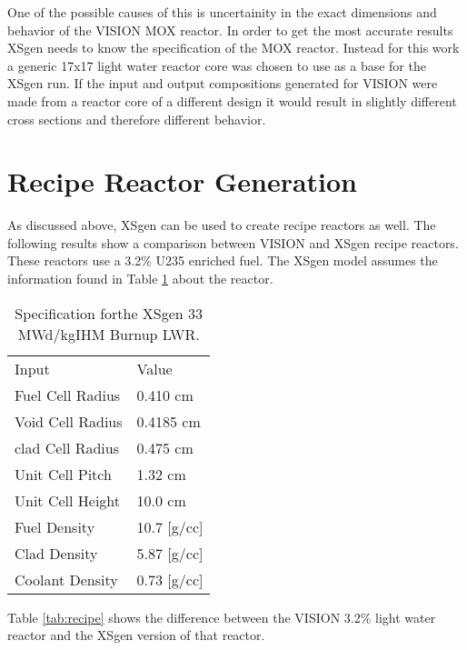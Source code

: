 \documentclass{article}
\begin{document}
One of the possible causes of this is uncertainity in the exact dimensions and behavior of the VISION MOX reactor. In order to get the most accurate results XSgen needs to know the specification of the MOX reactor. Instead for this work a generic 17x17 light water reactor core was chosen to use as a base for the XSgen run. If the input and output compositions generated for VISION were made from a reactor core of a different design it would result in slightly different cross sections and therefore different behavior.

\section{Recipe Reactor Generation}
As discussed above, XSgen can be used to create recipe reactors as well. The following results show a comparison between VISION and XSgen recipe reactors. These reactors use a 3.2\% U235 enriched fuel. The XSgen model assumes the information found in Table \ref{tab:xsgenstats} about the reactor.

\begin{table}[!htb]
\centering
\caption{Specification forthe XSgen 33 MWd/kgIHM Burnup LWR.}
\label{tab:xsgenstats}
\begin{tabular}{ll}
Input & Value \\
Fuel Cell Radius & 0.410 cm \\
Void Cell Radius & 0.4185 cm \\
clad Cell Radius & 0.475 cm \\
Unit Cell Pitch  & 1.32 cm \\
Unit Cell Height & 10.0 cm \\
Fuel Density & 10.7 [g/cc] \\
Clad Density & 5.87 [g/cc] \\
Coolant Density & 0.73 [g/cc]
\end{tabular}
\end{table}

Table \ref{tab:recipe} shows the difference between the VISION 3.2\% light water reactor and the XSgen version of that reactor.
\end{document}
